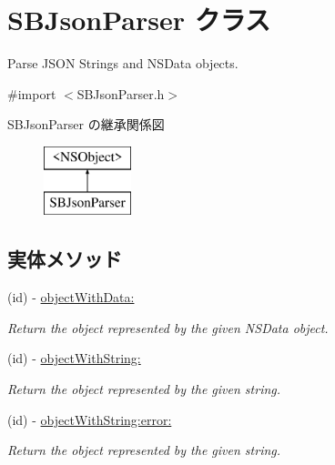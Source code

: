\hypertarget{interface_s_b_json_parser}{}\section{S\+B\+Json\+Parser クラス}
\label{interface_s_b_json_parser}


Parse J\+S\+O\+N Strings and N\+S\+Data objects.  




{\ttfamily \#import $<$S\+B\+Json\+Parser.\+h$>$}

S\+B\+Json\+Parser の継承関係図\begin{figure}[H]
\begin{center}
\leavevmode
\includegraphics[height=2.000000cm]{interface_s_b_json_parser}
\end{center}
\end{figure}
\subsection*{実体メソッド}
\begin{DoxyCompactItemize}
\item 
(id) -\/ \hyperlink{interface_s_b_json_parser_a66d7be591cdf0d9ee85c21c863ef5cbf}{object\+With\+Data\+:}
\begin{DoxyCompactList}\small\item\em Return the object represented by the given N\+S\+Data object. \end{DoxyCompactList}\item 
(id) -\/ \hyperlink{interface_s_b_json_parser_a1ec40b986576044d58d30172b141c74c}{object\+With\+String\+:}
\begin{DoxyCompactList}\small\item\em Return the object represented by the given string. \end{DoxyCompactList}\item 
(id) -\/ \hyperlink{interface_s_b_json_parser_a7a7fff47f41a08fa0defc4f628846e15}{object\+With\+String\+:error\+:}
\begin{DoxyCompactList}\small\item\em Return the object represented by the given string. \end{DoxyCompactList}\end{DoxyCompactItemize}
